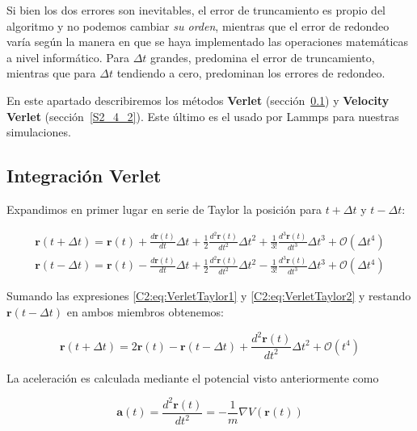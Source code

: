 Si bien los dos errores son inevitables, el error de truncamiento es propio del algoritmo y no podemos cambiar \textit{su orden}, mientras que el error de redondeo varía según la manera en que se haya implementado las operaciones matemáticas a nivel informático. Para $\Delta{}t$ grandes, predomina el error de truncamiento, mientras que para $\Delta{}t$ tendiendo a cero, predominan los errores de redondeo.

En este apartado describiremos los métodos \textbf{Verlet} (sección~\ref{S2_4_1}) y \textbf{Velocity Verlet} (sección~\ref{S2_4_2}). Este último es el usado por Lammps para nuestras simulaciones.

\subsection{Integración Verlet}
\label{S2_4_1}

Expandimos en primer lugar en serie de Taylor la posición para $t+\Delta{}t$ y $t-\Delta{}t$:

\begin{eqnarray}
\mathbf{r}(t+\Delta{}t) = \mathbf{r}(t)+\frac{d\mathbf{r}(t)}{dt} \Delta{}t + \frac{1}{2} \frac{d^{2}\mathbf{r}(t)}{dt^{2}} \Delta{}t^{2} + \frac{1}{3!} \frac{d^{3}\mathbf{r}(t)}{dt^{3}} \Delta{}t^{3} + \mathcal{O}(\Delta{}t^{4})
\label{C2:eq:VerletTaylor1} \\
\mathbf{r}(t-\Delta{}t) = \mathbf{r}(t)-\frac{d\mathbf{r}(t)}{dt} \Delta{}t + \frac{1}{2} \frac{d^{2}\mathbf{r}(t)}{dt^{2}} \Delta{}t^{2} - \frac{1}{3!} \frac{d^{3}\mathbf{r}(t)}{dt^{3}} \Delta{}t^{3} + \mathcal{O}(\Delta{}t^{4})
\label{C2:eq:VerletTaylor2}
\end{eqnarray}

Sumando las expresiones \ref{C2:eq:VerletTaylor1} y \ref{C2:eq:VerletTaylor2} y restando $\mathbf{r}(t-\Delta{}t)$ en ambos miembros obtenemos:

\begin{equation}
\mathbf{r}(t+\Delta{}t) = 2\mathbf{r}(t) - \mathbf{r}(t-\Delta{}t) + \frac{d^{2}\mathbf{r}(t)}{dt^{2}} \Delta{}t^{2} + \mathcal{O}(t^{4})
\label{C2:eq:VerletPos}
\end{equation}

La aceleración es calculada mediante el potencial visto anteriormente como

\begin{equation}
\mathbf{a}(t) = \frac{d^{2}\mathbf{r}(t)}{dt^{2}} = -\frac{1}{m}\nabla{}V(\mathbf{r}(t))
\end{equation}

